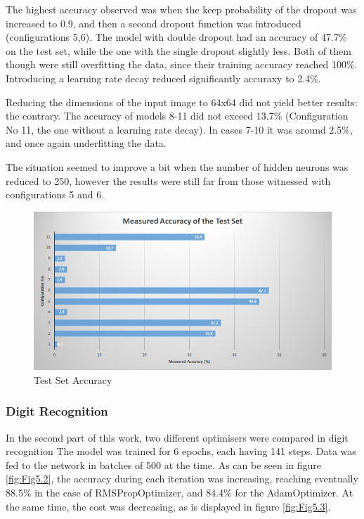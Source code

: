 \documentclass[final,12p,times]{elsarticle}
\begin{document}
The highest accuracy observed was when the keep probability of the dropout was increased to 0.9, and then a second dropout function was introduced (configurations 5,6).
The model with double dropout had an accuracy of 47.7\% on the test set, while the one with the single dropout slightly less.
Both of them though were still overfitting the data, since their training accuracy reached 100\%.
Introducing a learning rate decay reduced significantly accuraxy to 2.4\%.

Reducing the dimensions of the input image to 64x64 did not yield better results: the contrary.
The accuracy of models 8-11 did not exceed 13.7\% (Configuration No 11, the one without a learning rate decay).
In cases 7-10 it was around 2.5\%, and once again underfitting the data. 

The situation seemed to improve a bit when the number of hidden neurons was reduced to 250, however the results were still far from 
those witnessed with configurations 5 and 6.


\begin{figure}[H]
  \includegraphics[width=1.0\textwidth, center]{accuracy.png}
  \caption{Test Set Accuracy}
  \label{fig:Fig5.1}
  \end{figure}

\subsubsection{Digit Recognition}
\label{sec:5.1.2}
In the second part of this work, two different optimisers were compared in digit recognition
The model was trained for 6 epochs, each having 141 steps.
Data was fed to the network in batches of 500 at the time.
As can be seen in figure \ref{fig:Fig5.2}, the accuracy during each iteration was increasing, 
reaching eventually 88.5\% in the case of RMSPropOptimizer, and 84.4\% for the AdamOptimizer.
At the same time, the cost was decreasing, as is displayed in figure \ref{fig:Fig5.3}.
\end{document}
